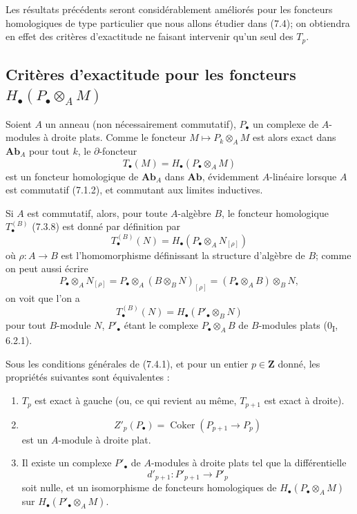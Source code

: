 Les résultats précédents seront considérablement améliorés pour les foncteurs
homologiques de type particulier que nous allons étudier dans (7.4); on
obtiendra en effet des critères d'exactitude ne faisant intervenir qu'un seul
des $T_p$.

\subsection{Critères d'exactitude pour les foncteurs
$H_\bullet(P_\bullet\otimes_A M)$}
\label{subsection:III.7.4.fr}

\begin{env}[7.4.1]
Soient $A$ un anneau (non nécessairement commutatif), $P_\bullet$ un complexe
de $A$-modules à droite plats. Comme le foncteur
$M\mapsto P_k\otimes_A M$ est alors exact dans $\mathbf{Ab}_A$ pour tout $k$,
le $\partial$-foncteur
\[
  T_\bullet(M)=H_\bullet(P_\bullet\otimes_A M)
  \tag{7.4.1.1}\label{III.7.4.1.1.fr}
\]
est un foncteur homologique de $\mathbf{Ab}_A$ dans $\mathbf{Ab}$,
évidemment $A$-linéaire lorsque $A$ est commutatif (7.1.2), et commutant aux
limites inductives.

Si $A$ est commutatif, alors, pour toute $A$-algèbre $B$, le foncteur
homologique $T_\bullet^{(B)}$ (7.3.8) est donné par définition par
\[
  T_\bullet^{(B)}(N)
  =
  H_\bullet(P_\bullet\otimes_A N_{[\rho]})
  \tag{7.4.1.2}\label{III.7.4.1.2.fr}
\]
où $\rho:A\to B$ est l'homomorphisme définissant la structure d'algèbre de
$B$; comme on peut aussi écrire
\[
  P_\bullet\otimes_A N_{[\rho]}
  =P_\bullet\otimes_A(B\otimes_B N)_{[\rho]}
  =(P_\bullet\otimes_A B)\otimes_B N,
\]
on voit que l'on a
\[
  T_\bullet^{(B)}(N)=H_\bullet(P'_\bullet\otimes_B N)
  \tag{7.4.1.3}\label{III.7.4.1.3.fr}
\]
pour tout $B$-module $N$, $P'_\bullet$ étant le complexe
$P_\bullet\otimes_A B$ de $B$-modules plats (0\textsubscript{I}, 6.2.1).
\end{env}

\begin{proposition}[7.4.2]
Sous les conditions générales de (7.4.1), et pour un entier $p\in\mathbf Z$
donné, les propriétés suivantes sont équivalentes :
\begin{enumerate}
  \item[a)] $T_p$ est exact à gauche (ou, ce qui revient au même, $T_{p+1}$
    est exact à droite).
  \item[b)]
    \[
      Z'_p(P_\bullet)
      =
      \operatorname{Coker}(P_{p+1}\longrightarrow P_p)
    \]
    est un $A$-module à droite plat.
  \item[c)] Il existe un complexe $P'_\bullet$ de $A$-modules à droite plats
    tel que la différentielle
    \[
      d'_{p+1}:P'_{p+1}\longrightarrow P'_p
    \]
    soit nulle, et un isomorphisme de foncteurs homologiques de
    $H_\bullet(P_\bullet\otimes_A M)$ sur
    $H_\bullet(P'_\bullet\otimes_A M)$.
\end{enumerate}
\end{proposition}

